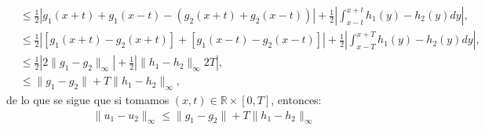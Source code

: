 \begin{homeworkProblem}
\begin{enumerate}[i]
\begin{solucion}
\begin{align*}
          &\leq \frac{1}{2}\left|g_1(x+t)+g_1(x-t)-(g_2(x+t)+g_2(x-t))\right|+\frac{1}{2}\left| \int_{x-t}^{x+t}h_1(y)-h_2(y)dy \right|,\\
          &\leq \frac{1}{2}\left|[g_1(x+t)-g_2(x+t)]+[g_1(x-t)-g_2(x-t)]\right|+\frac{1}{2}\left| \int_{x-T}^{x+T}h_1(y)-h_2(y)dy \right|,\\
          &\leq \frac{1}{2}\left|2\|g_1-g_2\|_{\infty}\right|+\frac{1}{2}\left| \|h_1-h_2\|_{\infty}2T \right|,\\
          &\leq \|g_1-g_2\|+T\|h_1-h_2\|_{\infty},
        \end{align*}
        de lo que se sigue que si tomamos $(x,t)\in \mathbb{R}\times [0,T]$, entonces:
        \begin{align*}
          \|u_1-u_2\|_{\infty}\leq \|g_1-g_2\|+T\|h_1-h_2\|_{\infty}
        \end{align*}
        \demostrado
      \end{solucion}
  \end{enumerate}
\end{homeworkProblem}
